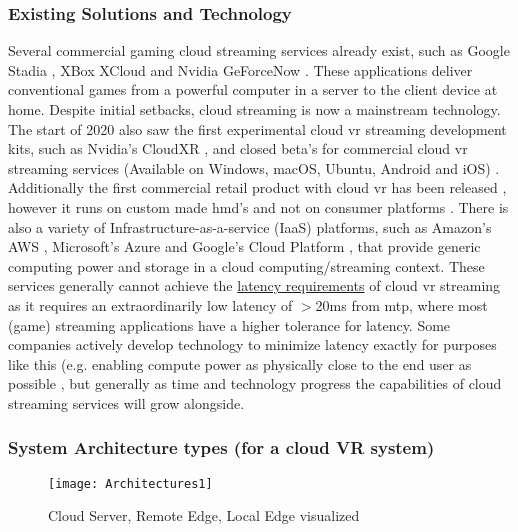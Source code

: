 \subsubsection{Existing Solutions and Technology}
Several commercial gaming cloud streaming services already exist, such as Google Stadia \parencite{stadia}, XBox XCloud \parencite{xcloud} and Nvidia GeForceNow \parencite{geforcenow}. These applications deliver conventional games from a powerful computer in a server to the client device at home. Despite initial setbacks, cloud streaming is now a mainstream technology. The start of 2020 also saw the first experimental cloud \acrshort{vr} streaming development kits, such as Nvidia's CloudXR \parencite{cloudxr}, and closed beta's for commercial cloud \acrshort{vr} streaming services \parencite{shadowvr} (Available on Windows, macOS, Ubuntu, Android and iOS) . Additionally the first commercial retail product with cloud \acrshort{vr} has been released \parencite{zerolight5g}, however it runs on custom made \acrshort{hmd}'s and not on consumer platforms . There is also a variety of Infrastructure\hyp{}as\hyp{}a\hyp{}service (IaaS) platforms, such as Amazon's AWS \parencite{aws}, Microsoft's Azure \parencite{azure} and Google's Cloud Platform \parencite{gcp}, that provide generic computing power and storage in a cloud computing/streaming context.
 These services generally cannot achieve the \hyperref[ssec:vrphy]{latency requirements} of cloud \acrshort{vr} streaming \parencite{survey_IRSS} as it requires an extraordinarily low latency of $>$20\acrshort{ms} from \acrfull{mtp}, where most (game) streaming applications have a higher tolerance for latency. Some companies actively develop technology to minimize latency exactly for purposes like this (e.g. enabling compute power as physically close to the end user as possible \parencite{awswavelength}, but generally as time and technology progress the capabilities of cloud streaming services will grow alongside.

\subsubsection{System Architecture types (for a cloud VR system)}
\begin{figure}[h]
\caption{Cloud Server, Remote Edge, Local Edge visualized \parencite{wlanvr}}
\label{fig:arch1}
\texttt{[image: Architectures1]}
\end{figure}

